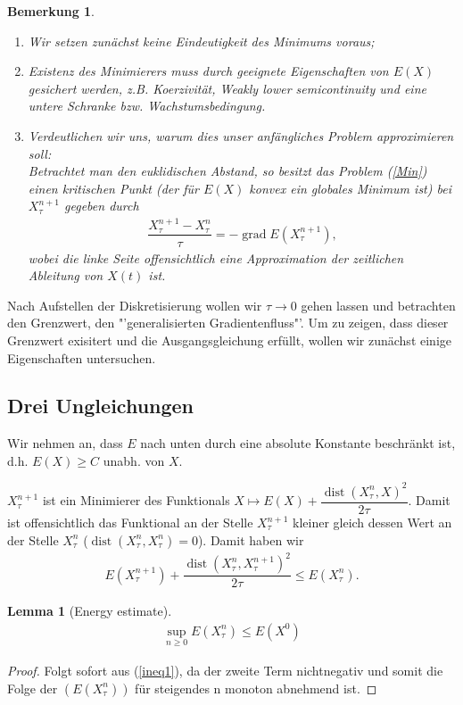 \documentclass[11pt,a4paper,notitlepage]{scrreprt}
\newcommand{\dist}{\operatorname{dist}}
\newcommand{\grad}{\operatorname{grad}}
\newtheorem{lem}[defi]{Lemma}
\newtheorem{bem}[defi]{Bemerkung}
\begin{document}
\begin{bem}
\begin{enumerate}
\item Wir setzen zunächst keine Eindeutigkeit des Minimums voraus;
\item Existenz des Minimierers muss durch geeignete Eigenschaften von $E(X)$ gesichert werden, z.B. Koerzivität, Weakly lower semicontinuity und eine untere Schranke bzw. Wachstumsbedingung. 
\item Verdeutlichen wir uns, warum dies unser anfängliches Problem approximieren soll:\\
Betrachtet man den euklidischen Abstand, so besitzt das Problem (\ref{Min}) einen kritischen Punkt (der für $E(X)$ konvex ein globales Minimum ist) bei $X_\tau^{n+1}$ gegeben durch 
\begin{eqnarray*}
\dfrac{X_\tau^{n+1}-X_\tau^n}{\tau}=-\grad E(X_\tau^{n+1}),
\end{eqnarray*}
wobei die linke Seite offensichtlich eine Approximation der zeitlichen Ableitung von $X(t)$ ist.
\end{enumerate}
\end{bem}
\vspace{3pt}
Nach Aufstellen der Diskretisierung wollen wir $\tau \to 0$ gehen lassen und betrachten den Grenzwert, den "'generalisierten Gradientenfluss"'.
Um zu zeigen, dass dieser Grenzwert exisitert und die Ausgangsgleichung erfüllt, wollen wir zunächst einige Eigenschaften untersuchen. 

\subsection{Drei Ungleichungen}
Wir nehmen an, dass $E$ nach unten durch eine absolute Konstante beschränkt ist, d.h. $E(X)\geq C$ unabh. von $X$.
\newline


$X_\tau^{n+1}$ ist ein Minimierer des Funktionals $X \mapsto E(X)+\dfrac{\dist(X_\tau^n,X)^2}{2\tau}$. Damit ist offensichtlich das Funktional an der Stelle $X_\tau^{n+1}$ kleiner gleich dessen Wert an der Stelle $X_\tau^n$ ($\dist(X_\tau^n,X_\tau^n)=0$). Damit haben wir
\begin{eqnarray}
E(X_\tau^{n+1})+\dfrac{\dist(X_\tau^n,X_\tau^{n+1})^2}{2\tau}\leq E(X_\tau^n). \label{ineq1}
\end{eqnarray} 
\begin{lem}[Energy estimate]
\begin{eqnarray}
\sup_{n\geq 0}E(X_\tau^n)\leq E(X^0) \label{enest}
\end{eqnarray}
\end{lem}
\begin{proof}
Folgt sofort aus (\ref{ineq1}), da der zweite Term nichtnegativ und somit die Folge der $(E(X_\tau^n))$ für steigendes n monoton abnehmend ist. 
\end{proof}
\end{document}
